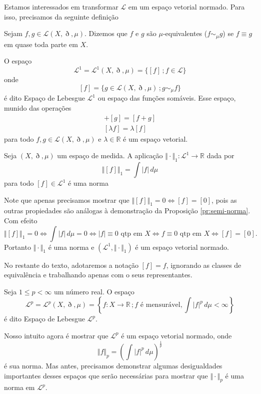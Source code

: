 \documentclass[a4paper, 11pt]{book}
\theoremstyle{definition}
\newcommand{\bR}{\mathbb{R}}
\newcommand{\cL}{\mathcal{L}}
\begin{document}
Estamos interessados em transformar $\cL$ em um espaço vetorial normado.
Para isso, precisamos da seguinte definição
\begin{dbox}
    Sejam $f,g \in \cL(X,\eth,\mu)$. Dizemos que $f$ e $g$ são $\mu$-equivalentes ($f \sim_\mu g$) se $f \equiv g$ em quase toda parte em $X$.
\end{dbox}
O espaço
\[
    \cL^1 = \cL^1(X,\eth,\mu) =\{[f] \,; f \in \cL\}
\]
onde
\[
    [f] = \{g \in \cL(X,\eth,\mu) \,; g \sim_\mu f\}
\]
é dito Espaço de Lebesgue $\cL^1$ ou espaço das funções somáveis.
Esse espaço, munido das operações
\begin{gather*}
    [f] + [g] = [f + g]\\
    [\lambda f] = \lambda [f]
\end{gather*}
para todo $f, g \in \cL(X,\eth,\mu)$ e $\lambda \in \bR$ é um espaço vetorial.

\begin{pbox}
    Seja $(X,\eth,\mu)$ um espaço de medida.
    A aplicação $\Vert \cdot \Vert_1 : \cL^1 \to \bR$ dada por
    \[
        \Vert [f] \Vert_1 = \int |f| \,d\mu
    \]
    para todo $[f] \in \cL^1$ é uma norma
\end{pbox}
\begin{prf}
    Note que apenas precisamos mostrar que $\Vert [f] \Vert_1 = 0 \iff [f] = [0]$, pois as outras propiedades são análogas à demonstração da Proposição \ref{pr:semi-norma}.
    Com efeito
    \[
        \Vert [f] \Vert_1 = 0 \iff \int |f| \,d\mu = 0 \iff |f| \equiv 0 \text{ qtp em } X \iff f \equiv 0 \text{ qtp em } X \iff [f] = [0].
    \]
    Portanto $\Vert \cdot \Vert_1$ é uma norma e $(\cL^1,\Vert \cdot \Vert_1)$ é um espaço vetorial normado.
\end{prf}

No restante do texto, adotaremos a notação $[f] = f$, ignorando as classes de equivalência e trabalhando apenas com o seus representantes.

\begin{dbox}
    Seja $1 \leqslant p < \infty$ um número real.
    O espaço
    \[
        \cL^p = \cL^p(X,\eth,\mu) = \left\{ f : X \to \bR \,; f \text{ é mensurável}, \int|f|^p \, d\mu < \infty \right\}
    \]
    é dito Espaço de Lebesgue $\cL^p$.
\end{dbox}
Nosso intuito agora é mostrar que $\cL^p$ é um espaço vetorial normado, onde
\[
    \Vert f \Vert_p = \left( \int |f|^p \,d\mu \right)^{\frac{1}{p}}
\]
é sua norma.
Mas antes, precisamos demonstrar algumas desigualdades importantes desses espaços que serão necessárias para mostrar que $\Vert \cdot \Vert_p$ é uma norma em $\cL^p$.
\end{document}
